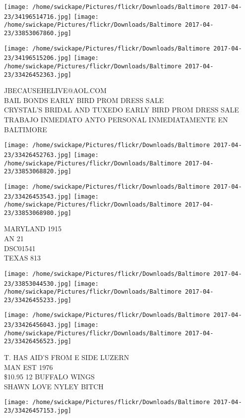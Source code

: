\documentclass[10pt,letterpaper]{article}
\begin{document}
\texttt{[image: /home/swickape/Pictures/flickr/Downloads/Baltimore 2017-04-23/34196514716.jpg]}
\texttt{[image: /home/swickape/Pictures/flickr/Downloads/Baltimore 2017-04-23/33853067860.jpg]}

\texttt{[image: /home/swickape/Pictures/flickr/Downloads/Baltimore 2017-04-23/34196515206.jpg]}
\texttt{[image: /home/swickape/Pictures/flickr/Downloads/Baltimore 2017-04-23/33426452363.jpg]}

JBECAUSEHELIVE@AOL.COM\\
BAIL BONDS EARLY BIRD PROM DRESS SALE\\
CRYSTAL'S BRIDAL AND TUXEDO EARLY BIRD PROM DRESS SALE\\
TRABAJO INMEDIATO ANTO PERSONAL INMEDIATAMENTE EN BALTIMORE\\
\pagebreak

\texttt{[image: /home/swickape/Pictures/flickr/Downloads/Baltimore 2017-04-23/33426452763.jpg]}
\texttt{[image: /home/swickape/Pictures/flickr/Downloads/Baltimore 2017-04-23/33853068820.jpg]}

\texttt{[image: /home/swickape/Pictures/flickr/Downloads/Baltimore 2017-04-23/33426453543.jpg]}
\texttt{[image: /home/swickape/Pictures/flickr/Downloads/Baltimore 2017-04-23/33853068980.jpg]}

MARYLAND 1915\\
AN 21\\
DSC01541\\
TEXAS 813\\
\pagebreak

\texttt{[image: /home/swickape/Pictures/flickr/Downloads/Baltimore 2017-04-23/33853044530.jpg]}
\texttt{[image: /home/swickape/Pictures/flickr/Downloads/Baltimore 2017-04-23/33426455233.jpg]}

\texttt{[image: /home/swickape/Pictures/flickr/Downloads/Baltimore 2017-04-23/33426456043.jpg]}
\texttt{[image: /home/swickape/Pictures/flickr/Downloads/Baltimore 2017-04-23/33426456523.jpg]}

T. HAS AID'S FROM E SIDE LUZERN\\
MAN EST 1976\\
\$10.95 12 BUFFALO WINGS\\
SHAWN LOVE NYLEY BITCH\\
\pagebreak

\texttt{[image: /home/swickape/Pictures/flickr/Downloads/Baltimore 2017-04-23/33426457153.jpg]}
\end{document}

